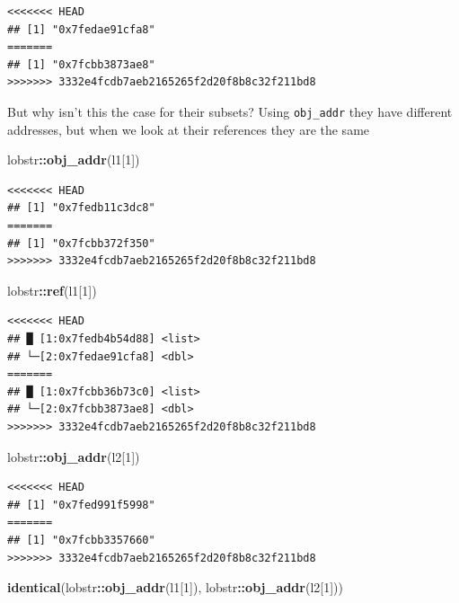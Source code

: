 \documentclass[]{book}
\newenvironment{Shaded}{\begin{snugshade}}{\end{snugshade}}
\newcommand{\DecValTok}[1]{\textcolor[rgb]{0.00,0.00,0.81}{#1}}
\newcommand{\KeywordTok}[1]{\textcolor[rgb]{0.13,0.29,0.53}{\textbf{#1}}}
\newcommand{\NormalTok}[1]{#1}
\newcommand{\OperatorTok}[1]{\textcolor[rgb]{0.81,0.36,0.00}{\textbf{#1}}}
\begin{document}
\begin{verbatim}
<<<<<<< HEAD
## [1] "0x7fedae91cfa8"
=======
## [1] "0x7fcbb3873ae8"
>>>>>>> 3332e4fcdb7aeb2165265f2d20f8b8c32f211bd8
\end{verbatim}

But why isn't this the case for their subsets? Using \texttt{obj\_addr} they have different addresses, but when we look at their references they are the same

\begin{Shaded}
\begin{Highlighting}[]
\NormalTok{lobstr}\OperatorTok{::}\KeywordTok{obj_addr}\NormalTok{(l1[}\DecValTok{1}\NormalTok{])}
\end{Highlighting}
\end{Shaded}

\begin{verbatim}
<<<<<<< HEAD
## [1] "0x7fedb11c3dc8"
=======
## [1] "0x7fcbb372f350"
>>>>>>> 3332e4fcdb7aeb2165265f2d20f8b8c32f211bd8
\end{verbatim}

\begin{Shaded}
\begin{Highlighting}[]
\NormalTok{lobstr}\OperatorTok{::}\KeywordTok{ref}\NormalTok{(l1[}\DecValTok{1}\NormalTok{])}
\end{Highlighting}
\end{Shaded}

\begin{verbatim}
<<<<<<< HEAD
## █ [1:0x7fedb4b54d88] <list> 
## └─[2:0x7fedae91cfa8] <dbl>
=======
## █ [1:0x7fcbb36b73c0] <list> 
## └─[2:0x7fcbb3873ae8] <dbl>
>>>>>>> 3332e4fcdb7aeb2165265f2d20f8b8c32f211bd8
\end{verbatim}

\begin{Shaded}
\begin{Highlighting}[]
\NormalTok{lobstr}\OperatorTok{::}\KeywordTok{obj_addr}\NormalTok{(l2[}\DecValTok{1}\NormalTok{])}
\end{Highlighting}
\end{Shaded}

\begin{verbatim}
<<<<<<< HEAD
## [1] "0x7fed991f5998"
=======
## [1] "0x7fcbb3357660"
>>>>>>> 3332e4fcdb7aeb2165265f2d20f8b8c32f211bd8
\end{verbatim}

\begin{Shaded}
\begin{Highlighting}[]
\KeywordTok{identical}\NormalTok{(lobstr}\OperatorTok{::}\KeywordTok{obj_addr}\NormalTok{(l1[}\DecValTok{1}\NormalTok{]), lobstr}\OperatorTok{::}\KeywordTok{obj_addr}\NormalTok{(l2[}\DecValTok{1}\NormalTok{]))}
\end{Highlighting}
\end{Shaded}
\end{document}

